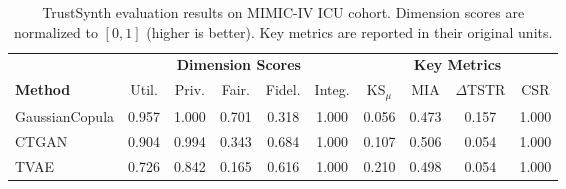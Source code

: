 \begin{table}[ht]
\centering
\caption{TrustSynth evaluation results on MIMIC-IV ICU cohort. Dimension scores are normalized to $[0,1]$ (higher is better). Key metrics are reported in their original units.}
\label{tab:results}
\small
\begin{tabular}{@{}l ccccc cccc@{}}
\toprule
& \multicolumn{5}{c}{\textbf{Dimension Scores}} & \multicolumn{4}{c}{\textbf{Key Metrics}} \\
\cmidrule(lr){2-6} \cmidrule(lr){7-10}
\textbf{Method} & Util. & Priv. & Fair. & Fidel. & Integ. & KS$_\mu$ & MIA & $\Delta$TSTR & CSR \\
\midrule
GaussianCopula & 0.957 & 1.000 & 0.701 & 0.318 & 1.000 & 0.056 & 0.473 & 0.157 & 1.000 \\
CTGAN & 0.904 & 0.994 & 0.343 & 0.684 & 1.000 & 0.107 & 0.506 & 0.054 & 1.000 \\
TVAE & 0.726 & 0.842 & 0.165 & 0.616 & 1.000 & 0.210 & 0.498 & 0.054 & 1.000 \\
\bottomrule
\end{tabular}
\end{table}